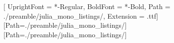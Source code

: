 \usepackage{fontspec}

\newfontfamily{}[
    UprightFont = *-Regular,
    BoldFont = *-Bold,
    Path = ./preamble/julia_mono_listings/,
    Extension = .ttf]
\newfontface{}[Path=./preamble/julia_mono_listings/]
\newfontface{}[Path=./preamble/julia_mono_listings/]

